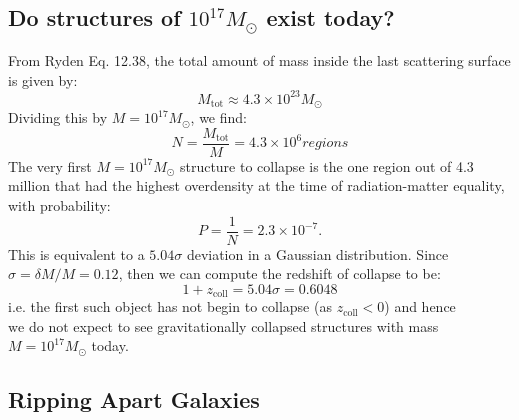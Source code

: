 \subsection{Do structures of $10^{17}M_\odot$ exist today?}
From Ryden Eq. 12.38, the total amount of mass inside the last scattering surface is given by:
\begin{equation}
    M_{\text{tot}} \approx 4.3 \times 10^{23}M_\odot
\end{equation}
Dividing this by $M = 10^{17}M_\odot$, we find:
\begin{equation}
    N = \frac{M_{\text{tot}}}{M} = 4.3 \times 10^6 \si{regions}
\end{equation}
The very first $M = 10^{17}M_\odot$ structure to collapse is the one region out of 4.3 million that had the highest overdensity at the time of radiation-matter equality, with probability:
\begin{equation}
    P = \frac{1}{N} = 2.3 \times 10^{-7}.
\end{equation}
This is equivalent to a $5.04\sigma$ deviation in a Gaussian distribution. Since $\sigma = \delta M/M = 0.12$, then we can compute the redshift of collapse to be:
\begin{equation}
    1 + z_{\text{coll}} = 5.04\sigma = 0.6048
\end{equation}
i.e. the first such object has not begin to collapse (as $z_{\text{coll}} < 0$) and hence $\boxed{\text{we do not}}$ expect to see gravitationally collapsed structures with mass $M = 10^{17}M_\odot$ today.

\subsection{Ripping Apart Galaxies}
